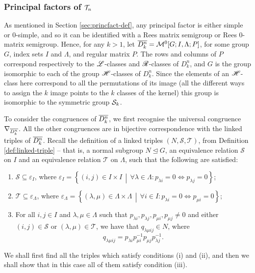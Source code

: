 \subsubsection{Principal factors of $\mathcal{T}_n$}
As mentioned in Section \ref{sec:princfact-def}, any principal factor is either
simple or 0-simple, and so it can be identified with a Rees matrix semigroup or
Rees 0-matrix semigroup.  Hence, for any $k > 1$, let
$\overline{D_k^n} = \mathcal{M}^0[G;I,\Lambda;P]$, for some group $G$, index sets $I$
and $\Lambda$, and regular matrix $P$.  The rows and columns of
$P$ correspond respectively to the $\mathrel{\mathscr{L}}$-classes and $\mathrel{\mathscr{R}}$-classes of $D_k^n$,
and $G$ is the group isomorphic to each of the group $\mathrel{\mathscr{H}}$-classes of $D_k^n$.
Since the elements of an $\mathrel{\mathscr{H}}$-class here correspond to all the permutations of
its image (all the different ways to assign the $k$ image points to the $k$
classes of the kernel) this group is isomorphic to the symmetric group $\mathcal{S}_k$.

To consider the congruences of $\overline{D_k^n}$, we first recognise the universal
congruence $\nabla_{\overline{D_k^n}}$.  All the other congruences are in bijective
correspondence with the linked triples of $\overline{D_k^n}$.  Recall the definition
of a linked triples $(N,\mathcal{S},\mathcal{T})$, from Definition
\ref{def:linked-triple} -- that is, a normal subgroup $N \trianglelefteq G$, an
equivalence relation $\mathcal{S}$ on $I$ and an equivalence relation
$\mathcal{T}$ on $\Lambda$, such that the following are satisfied:
\begin{enumerate}[\rm(i)]
\item $\mathcal{S} \subseteq \varepsilon_I$, where
  $\varepsilon_I = \left\{(i,j) \in I \times I\, \middle|\, \forall \lambda \in
    \Lambda: p_{\lambda i}=0 \iff p_{\lambda j}=0 \right\}$;
\item $\mathcal{T} \subseteq \varepsilon_\Lambda$, where
  $\varepsilon_\Lambda = \left\{(\lambda,\mu) \in \Lambda \times \Lambda\,
    \middle|\, \forall i \in I: p_{\lambda i}=0 \iff p_{\mu i}=0 \right\}$;
\item For all $i,j \in I$ and $\lambda, \mu \in \Lambda$ such that
  $p_{\lambda i}, p_{\lambda j}, p_{\mu i}, p_{\mu j} \neq 0$ and either
  $(i,j) \in \mathcal{S}$ or $(\lambda,\mu) \in \mathcal{T}$, we have that
  $q_{\lambda \mu i j} \in N$, where
  $$q_{\lambda \mu i j} = p_{\lambda i} p_{\mu i}^{-1} p_{\mu j} p_{\lambda
    j}^{-1}.$$
\end{enumerate}
We shall first find all the triples which satisfy conditions (i) and (ii), and
then we shall show that in this case all of them satisfy condition (iii).

